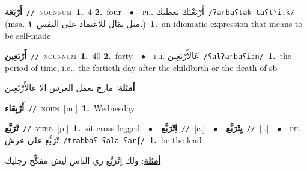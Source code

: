 \documentclass[10pt,a4paper,twoside]{article} %
\begin{document}
\begin{multicols}{2}
{\setlength\topsep{0pt}\textbf{\foreignlanguage{arabic}{أَرْبَعَة}}\ {\color{gray}\texttt{//}\color{black}}\ \textsc{noun\textunderscore num}\ \textbf{1.}~4  \textbf{2.}~four\ \ $\bullet$\ \ \textsc{ph.} \color{gray} \foreignlanguage{arabic}{أَرْبَعْتَك تعطيك}\color{black}\ {\color{gray}\texttt{/{\sffamily ʔarbaʕtak taʕtˤiːk}/}\color{black}}\ \color{gray} (msa. \foreignlanguage{arabic}{مثل يقال للاعتماد على النفس}~\foreignlanguage{arabic}{\textbf{١.}})\color{black}\ \textbf{1.}~an idiomatic expression that means  to be self-made\ } \vspace{2mm}

{\setlength\topsep{0pt}\textbf{\foreignlanguage{arabic}{أَرْبَعِين}}\ {\color{gray}\texttt{//}\color{black}}\ \textsc{noun\textunderscore num}\ \textbf{1.}~40  \textbf{2.}~forty\ \ $\bullet$\ \ \textsc{ph.} \color{gray} \foreignlanguage{arabic}{عَالأَرْبَعِين}\color{black}\ {\color{gray}\texttt{/{\sffamily ʕalʔarbaʕiːn}/}\color{black}}\ \textbf{1.}~the period of time, i.e., the fortieth day after the childbirth or the death of sb\  \begin{flushright}\color{gray}\foreignlanguage{arabic}{\textbf{\underline{\foreignlanguage{arabic}{أمثلة}}}: مارح نعمل العرس الا عالأَرْبَعِين}\end{flushright}\color{black}} \vspace{2mm}

{\setlength\topsep{0pt}\textbf{\foreignlanguage{arabic}{أَرْبِعَاء}}\ {\color{gray}\texttt{//}\color{black}}\ \textsc{noun}\ [m.]\ \textbf{1.}~Wednesday\ } \vspace{2mm}

{\setlength\topsep{0pt}\textbf{\foreignlanguage{arabic}{تْرَبَّع}}\ {\color{gray}\texttt{//}\color{black}}\ \textsc{verb}\ [p.]\ \textbf{1.}~sit cross-legged\ \ $\bullet$\ \ \setlength\topsep{0pt}\textbf{\foreignlanguage{arabic}{اِتْرَبَّع}}\ {\color{gray}\texttt{//}\color{black}}\ [c.]\ \ $\bullet$\ \ \setlength\topsep{0pt}\textbf{\foreignlanguage{arabic}{يِتْرَبَّع}}\ {\color{gray}\texttt{//}\color{black}}\ [i.]\ \ $\bullet$\ \ \textsc{ph.} \color{gray} \foreignlanguage{arabic}{تْرَبَّع على عرش}\color{black}\ {\color{gray}\texttt{/{\sffamily trabbaʕ ʕala ʕarʃ}/}\color{black}}\ \textbf{1.}~be the lead\  \begin{flushright}\color{gray}\foreignlanguage{arabic}{\textbf{\underline{\foreignlanguage{arabic}{أمثلة}}}: ولك اِتْرَبَّع زي الناس ليش مفكِّح رجليك}\end{flushright}\color{black}} \vspace{2mm}


\end{multicols}
\end{document}
